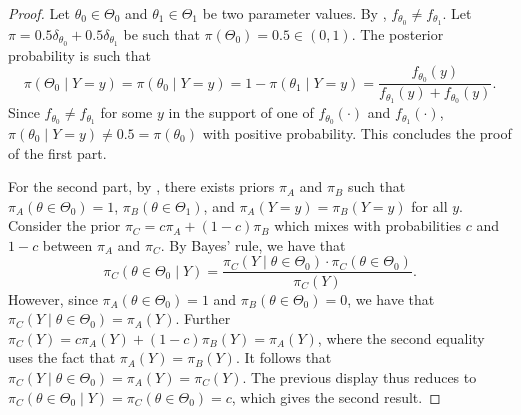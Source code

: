 \documentclass[12pt,reqno]{amsart}
\begin{document}
\begin{proof}
    Let $\theta_0 \in \Theta_0$ and $\theta_1 \in \Theta_1$ be two parameter values. By
    , $f_{\theta_0} \neq f_{\theta_1}$. Let $\pi = 0.5 \delta_{\theta_0} +
    0.5 \delta_{\theta_1}$ be such that $\pi(\Theta_0) = 0.5 \in (0,1)$. The posterior
    probability is such that \[
        \pi(\Theta_0 \mid Y=y) = \pi(\theta_0 \mid Y=y) = 1-\pi(\theta_1 \mid Y=y) = \frac{f_{\theta_0}(y)}{f_
        {\theta_1}(y) + f_{\theta_0}(y)}.
    \]
    Since $f_{\theta_0} \neq f_{\theta_1}$ for some $y$ in the support of one of $f_
    {\theta_0}(\cdot)$ and $f_{\theta_1}(\cdot)$, $\pi(\theta_0 \mid Y=y) \neq 0.5 = \pi
    (\theta_0)$ with positive probability. This concludes the proof of the first part.
    
    For the second part, by , there exists priors $\pi_A$ and $\pi_B$ such that $\pi_A(\theta \in \Theta_0) = 1$, $\pi_B(\theta \in \Theta_1)$, and $\pi_A(Y =y) = \pi_B(Y =y)$ for all $y$. Consider the prior $\pi_C = c \pi_A + (1-c) \pi_B$ which mixes with probabilities $c$ and $1-c$ between $\pi_A$ and $\pi_C$. By Bayes' rule, we have that 
$$\pi_C(\theta \in \Theta_0 \mid Y) = \dfrac{\pi_C(Y \mid \theta \in \Theta_0) \cdot  \pi_C(\theta \in \Theta_0)}{\pi_C(Y)} . $$
\noindent However, since $\pi_A(\theta \in \Theta_0) = 1$ and $\pi_B(\theta \in \Theta_0) = 0$, we have that $\pi_C(Y \mid \theta \in \Theta_0) = \pi_A(Y)$. Further $\pi_C(Y) = c \pi_A(Y) + (1-c) \pi_B(Y) = \pi_A(Y)$, where the second equality uses the fact that $\pi_A(Y) = \pi_B(Y)$. It follows that $\pi_C(Y \mid \theta \in \Theta_0) = \pi_A(Y) = \pi_C(Y)$. The previous display thus reduces to $\pi_C(\theta \in \Theta_0 \mid Y) = \pi_C(\theta \in \Theta_0) =c$, which gives the second result.

    
\end{proof}
\end{document}
